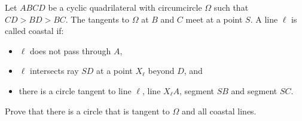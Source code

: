 Let $ABCD$ be a cyclic quadrilateral with circumcircle $\Omega$ such that $CD>BD>BC$. The tangents to $\Omega$ at $B$ and $C$ meet at a point $S$. A line $\ell$ is called coastal if:
\begin{itemize}
\item $\ell$ does not pass through $A$,
\item $\ell$ intersects ray $SD$ at a point $X_\ell$ beyond $D$, and
\item there is a circle tangent to line $\ell$, line $X_\ell A$, segment $SB$ and segment $SC$.
\end{itemize}
Prove that there is a circle that is tangent to $\Omega$ and all coastal lines.
